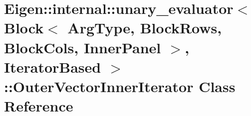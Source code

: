 \hypertarget{class_eigen_1_1internal_1_1unary__evaluator_3_01_block_3_01_arg_type_00_01_block_rows_00_01_bloc652d26bcece9990189dc15f4df1c964f}{}\section{Eigen\+::internal\+::unary\+\_\+evaluator$<$ Block$<$ Arg\+Type, Block\+Rows, Block\+Cols, Inner\+Panel $>$, Iterator\+Based $>$\+::Outer\+Vector\+Inner\+Iterator Class Reference}
\label{class_eigen_1_1internal_1_1unary__evaluator_3_01_block_3_01_arg_type_00_01_block_rows_00_01_bloc652d26bcece9990189dc15f4df1c964f}
